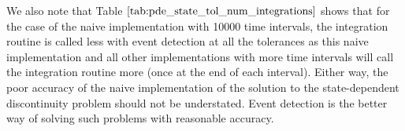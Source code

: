 \documentclass{article}
\begin{document}
We also note that Table $\ref{tab:pde_state_tol_num_integrations}$ shows that for the case of the naive implementation with 10000 time intervals, the integration routine is called less with event detection at all the tolerances as this naive implementation and all other implementations with more time intervals will call the integration routine more (once at the end of each interval). Either way, the poor accuracy of the naive implementation of the solution to the state-dependent discontinuity problem should not be understated. Event detection is the better way of solving such problems with reasonable accuracy. 
\end{document}
